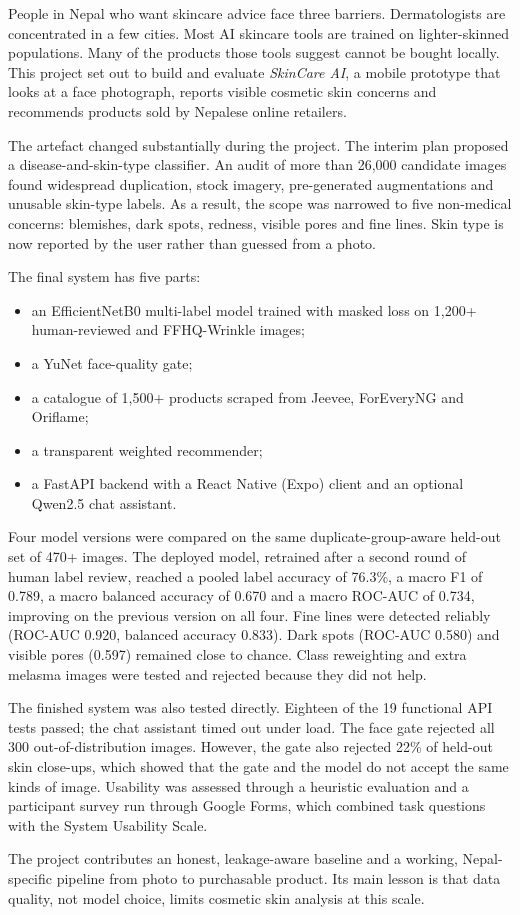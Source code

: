 
People in Nepal who want skincare advice face three barriers. Dermatologists are concentrated in a few cities. Most AI skincare tools are trained on lighter-skinned populations. Many of the products those tools suggest cannot be bought locally. This project set out to build and evaluate \emph{SkinCare AI}, a mobile prototype that looks at a face photograph, reports visible cosmetic skin concerns and recommends products sold by Nepalese online retailers.

The artefact changed substantially during the project. The interim plan proposed a disease-and-skin-type classifier. An audit of more than 26,000 candidate images found widespread duplication, stock imagery, pre-generated augmentations and unusable skin-type labels. As a result, the scope was narrowed to five non-medical concerns: blemishes, dark spots, redness, visible pores and fine lines. Skin type is now reported by the user rather than guessed from a photo.

The final system has five parts:
\begin{itemize}
  \item an EfficientNetB0 multi-label model trained with masked loss on 1,200+ human-reviewed and FFHQ-Wrinkle images;
  \item a YuNet face-quality gate;
  \item a catalogue of 1,500+ products scraped from Jeevee, ForEveryNG and Oriflame;
  \item a transparent weighted recommender;
  \item a FastAPI backend with a React Native (Expo) client and an optional Qwen2.5 chat assistant.
\end{itemize}

Four model versions were compared on the same duplicate-group-aware held-out set of 470+ images. The deployed model, retrained after a second round of human label review, reached a pooled label accuracy of 76.3\%, a macro F1 of 0.789, a macro balanced accuracy of 0.670 and a macro ROC-AUC of 0.734, improving on the previous version on all four. Fine lines were detected reliably (ROC-AUC 0.920, balanced accuracy 0.833). Dark spots (ROC-AUC 0.580) and visible pores (0.597) remained close to chance. Class reweighting and extra melasma images were tested and rejected because they did not help.

The finished system was also tested directly. Eighteen of the 19 functional API tests passed; the chat assistant timed out under load. The face gate rejected all 300 out-of-distribution images. However, the gate also rejected 22\% of held-out skin close-ups, which showed that the gate and the model do not accept the same kinds of image. Usability was assessed through a heuristic evaluation and a participant survey run through Google Forms, which combined task questions with the System Usability Scale.

The project contributes an honest, leakage-aware baseline and a working, Nepal-specific pipeline from photo to purchasable product. Its main lesson is that data quality, not model choice, limits cosmetic skin analysis at this scale.
